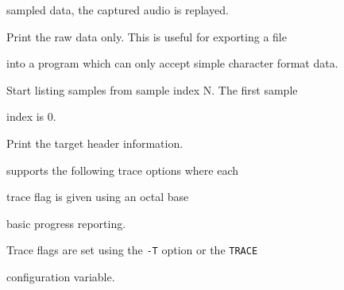 \begin{optlist}
     sampled data, the captured audio is replayed.





    Print the raw data only.  This is useful for exporting a file


     into a program which can only accept simple character format data.





    Start listing samples from sample index N.  The first sample


index is 0.


 


    Print the target header information.





\stdoptF





\end{optlist}












 supports the following trace options where each


trace flag is given using an octal base


\begin{optlist}


    basic progress reporting.


\end{optlist}


Trace flags are set using the \texttt{-T} option or the  \texttt{TRACE} 


configuration variable.


















